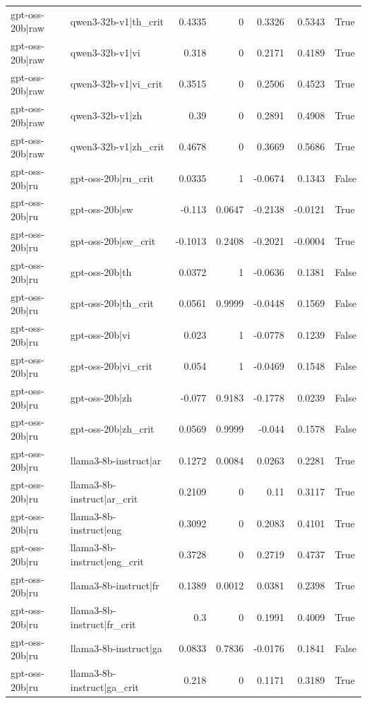 \begin{table}
\begin{tabular}{l l r r r r l}
gpt-oss-20b|raw & qwen3-32b-v1|th_crit & 0.4335 & 0 & 0.3326 & 0.5343 & True \\
gpt-oss-20b|raw & qwen3-32b-v1|vi & 0.318 & 0 & 0.2171 & 0.4189 & True \\
gpt-oss-20b|raw & qwen3-32b-v1|vi_crit & 0.3515 & 0 & 0.2506 & 0.4523 & True \\
gpt-oss-20b|raw & qwen3-32b-v1|zh & 0.39 & 0 & 0.2891 & 0.4908 & True \\
gpt-oss-20b|raw & qwen3-32b-v1|zh_crit & 0.4678 & 0 & 0.3669 & 0.5686 & True \\
gpt-oss-20b|ru & gpt-oss-20b|ru_crit & 0.0335 & 1 & -0.0674 & 0.1343 & False \\
gpt-oss-20b|ru & gpt-oss-20b|sw & -0.113 & 0.0647 & -0.2138 & -0.0121 & True \\
gpt-oss-20b|ru & gpt-oss-20b|sw_crit & -0.1013 & 0.2408 & -0.2021 & -0.0004 & True \\
gpt-oss-20b|ru & gpt-oss-20b|th & 0.0372 & 1 & -0.0636 & 0.1381 & False \\
gpt-oss-20b|ru & gpt-oss-20b|th_crit & 0.0561 & 0.9999 & -0.0448 & 0.1569 & False \\
gpt-oss-20b|ru & gpt-oss-20b|vi & 0.023 & 1 & -0.0778 & 0.1239 & False \\
gpt-oss-20b|ru & gpt-oss-20b|vi_crit & 0.054 & 1 & -0.0469 & 0.1548 & False \\
gpt-oss-20b|ru & gpt-oss-20b|zh & -0.077 & 0.9183 & -0.1778 & 0.0239 & False \\
gpt-oss-20b|ru & gpt-oss-20b|zh_crit & 0.0569 & 0.9999 & -0.044 & 0.1578 & False \\
gpt-oss-20b|ru & llama3-8b-instruct|ar & 0.1272 & 0.0084 & 0.0263 & 0.2281 & True \\
gpt-oss-20b|ru & llama3-8b-instruct|ar_crit & 0.2109 & 0 & 0.11 & 0.3117 & True \\
gpt-oss-20b|ru & llama3-8b-instruct|eng & 0.3092 & 0 & 0.2083 & 0.4101 & True \\
gpt-oss-20b|ru & llama3-8b-instruct|eng_crit & 0.3728 & 0 & 0.2719 & 0.4737 & True \\
gpt-oss-20b|ru & llama3-8b-instruct|fr & 0.1389 & 0.0012 & 0.0381 & 0.2398 & True \\
gpt-oss-20b|ru & llama3-8b-instruct|fr_crit & 0.3 & 0 & 0.1991 & 0.4009 & True \\
gpt-oss-20b|ru & llama3-8b-instruct|ga & 0.0833 & 0.7836 & -0.0176 & 0.1841 & False \\
gpt-oss-20b|ru & llama3-8b-instruct|ga_crit & 0.218 & 0 & 0.1171 & 0.3189 & True \\

\end{tabular}
\end{table}
